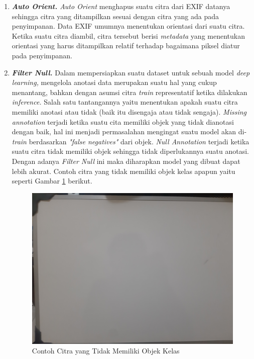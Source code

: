 \begin{enumerate}[nolistsep]
    \item \textit{\textbf{Auto Orient.} Auto Orient} menghapus suatu citra dari EXIF datanya sehingga citra yang ditampilkan sesuai dengan citra yang ada pada penyimpanan. Data EXIF umumnya menentukan orientasi dari suatu citra. Ketika suatu citra diambil, citra tersebut berisi \textit{metadata} yang menentukan orientasi yang harus ditampilkan relatif terhadap bagaimana piksel diatur pada penyimpanan.
    \item \textit{\textbf{Filter Null.}} Dalam mempersiapkan suatu dataset untuk sebuah model \textit{deep learning,} mengelola anotasi data merupakan suatu hal yang cukup menantang, bahkan dengan asumsi citra \textit{train} representatif ketika dilakukan \textit{inference.} Salah satu tantangannya yaitu menentukan apakah suatu citra memiliki anotasi atau tidak (baik itu disengaja atau tidak sengaja). \textit{Missing annotation} terjadi ketika suatu cita memiliki objek yang tidak dianotasi dengan baik, hal ini menjadi permasalahan mengingat suatu model akan di-\textit{train} berdasarkan \textit{"false negatives"} dari objek. \textit{Null Annotation} terjadi ketika suatu citra tidak memiliki objek sehingga tidak diperlukannya suatu anotasi. Dengan adanya \textit{Filter Null} ini maka diharapkan model yang dibuat dapat lebih akurat. Contoh citra yang tidak memiliki objek kelas apapun yaitu seperti Gambar \ref*{fig:nullimage} berikut.
    \begin{figure}[H]
        \centering
        \includegraphics[scale=0.04]{gambar/null_image.jpg}
        \caption{Contoh Citra yang Tidak Memiliki Objek Kelas}
        \label{fig:nullimage}
    \end{figure}

\end{enumerate}
